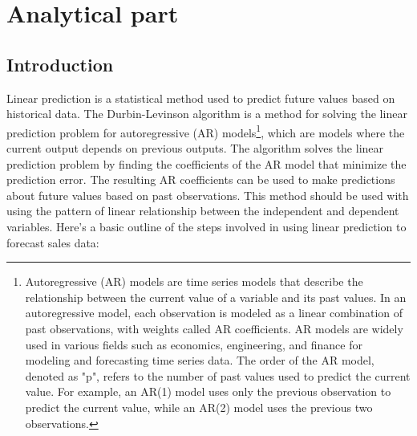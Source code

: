 
\chapter{Analytical part} \label{sec:analytical}

\section{Introduction} \label{sec:introduction}

Linear prediction is a statistical method used to predict future values based on historical data.
The Durbin-Levinson algorithm is a method for solving the linear prediction problem for autoregressive (AR) 
models\footnote{Autoregressive (AR) models are time series models that describe the relationship between the current
value of a variable and its past values. In an autoregressive model, each observation is modeled as a linear combination of
past observations, with weights called AR coefficients. AR models are widely used in various fields such as economics,
engineering, and finance for modeling and forecasting time series data. The order of the AR model, denoted as "p",
refers to the number of past values used to predict the current value. For example, an AR(1) model uses only the previous
observation to predict the current value, while an AR(2) model uses the previous two observations.},
which are models where the current output depends on previous outputs. The algorithm solves the linear prediction problem by
finding the coefficients of the AR model that minimize the prediction error. The resulting AR coefficients can be
used to make predictions about future values based on past observations. This method should be used with using the pattern of
linear relationship between the independent and dependent variables. 
Here's a basic outline of the steps involved in using linear prediction to forecast sales data:

